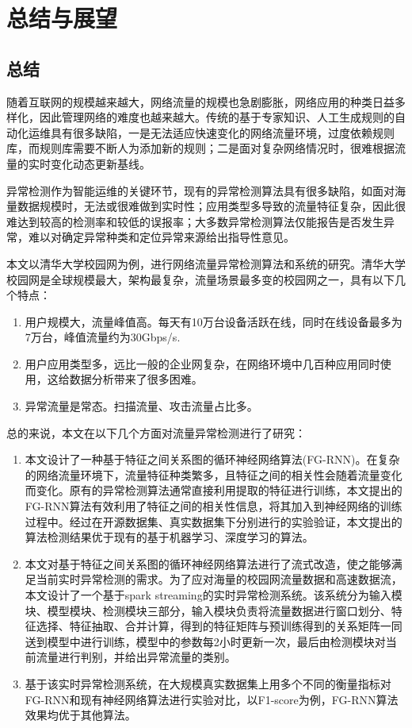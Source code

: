 \chapter{总结与展望}
\section{总结}
随着互联网的规模越来越大，网络流量的规模也急剧膨胀，网络应用的种类日益多样化，因此管理网络的难度也越来越大。传统的基于专家知识、人工生成规则的自动化运维具有很多缺陷，一是无法适应快速变化的网络流量环境，过度依赖规则库，而规则库需要不断人为添加新的规则；二是面对复杂网络情况时，很难根据流量的实时变化动态更新基线。

异常检测作为智能运维的关键环节，现有的异常检测算法具有很多缺陷，如面对海量数据规模时，无法或很难做到实时性；应用类型多导致的流量特征复杂，因此很难达到较高的检测率和较低的误报率；大多数异常检测算法仅能报告是否发生异常，难以对确定异常种类和定位异常来源给出指导性意见。

本文以清华大学校园网为例，进行网络流量异常检测算法和系统的研究。清华大学校园网是全球规模最大，架构最复杂，流量场景最多变的校园网之一，具有以下几个特点：
\begin{enumerate}
    \item 用户规模大，流量峰值高。每天有10万台设备活跃在线，同时在线设备最多为7万台，峰值流量约为30Gbps/s.
    \item	用户应用类型多，远比一般的企业网复杂，在网络环境中几百种应用同时使用，这给数据分析带来了很多困难。
    \item	异常流量是常态。扫描流量、攻击流量占比多。
\end{enumerate}

总的来说，本文在以下几个方面对流量异常检测进行了研究：
\begin{enumerate}
    \item 本文设计了一种基于特征之间关系图的循环神经网络算法(FG-RNN)。在复杂的网络流量环境下，流量特征种类繁多，且特征之间的相关性会随着流量变化而变化。原有的异常检测算法通常直接利用提取的特征进行训练，本文提出的FG-RNN算法有效利用了特征之间的相关性信息，将其加入到神经网络的训练过程中。经过在开源数据集、真实数据集下分别进行的实验验证，本文提出的算法检测结果优于现有的基于机器学习、深度学习的算法。
    \item 本文对基于特征之间关系图的循环神经网络算法进行了流式改造，使之能够满足当前实时异常检测的需求。为了应对海量的校园网流量数据和高速数据流，本文设计了一个基于spark streaming的实时异常检测系统。该系统分为输入模块、模型模块、检测模块三部分，输入模块负责将流量数据进行窗口划分、特征选择、特征抽取、合并计算，得到的特征矩阵与预训练得到的关系矩阵一同送到模型中进行训练，模型中的参数每2小时更新一次，最后由检测模块对当前流量进行判别，并给出异常流量的类别。
    \item 基于该实时异常检测系统，在大规模真实数据集上用多个不同的衡量指标对FG-RNN和现有神经网络算法进行实验对比，以F1-score为例，FG-RNN算法效果均优于其他算法。
\end{enumerate}

